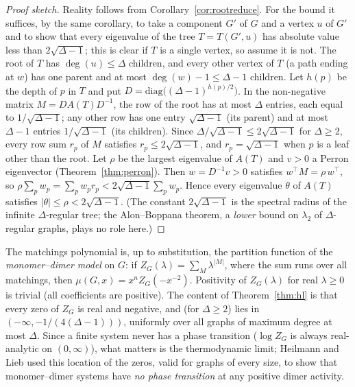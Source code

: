 \begin{proof}[Proof sketch]
Reality follows from Corollary~\ref{cor:rootreduce}. For the bound it
suffices, by the same corollary, to take a component $G'$ of $G$ and a
vertex $u$ of $G'$ and to show that every eigenvalue of the tree
$T = T(G', u)$ has absolute value less than $2\sqrt{\Delta - 1}$; this is
clear if $T$ is a single vertex, so assume it is not. The root of $T$
has $\deg(u) \le \Delta$ children, and every other vertex of $T$ (a path
ending at $w$) has one parent and at most $\deg(w) - 1 \le \Delta - 1$
children. Let $h(p)$ be the depth of $p$ in $T$ and put
$D = \mathrm{diag}\big((\Delta - 1)^{h(p)/2}\big)$. In the non-negative
matrix $M = D A(T) D^{-1}$, the row of the root has at most $\Delta$
entries, each equal to $1/\sqrt{\Delta - 1}$; any other row has one entry
$\sqrt{\Delta - 1}$ (its parent) and at most $\Delta - 1$ entries
$1/\sqrt{\Delta - 1}$ (its children). Since
$\Delta/\sqrt{\Delta - 1} \le 2\sqrt{\Delta - 1}$ for $\Delta \ge 2$, every
row sum $r_p$ of $M$ satisfies $r_p \le 2\sqrt{\Delta - 1}$, and
$r_p = \sqrt{\Delta - 1}$ when $p$ is a leaf other than the root. Let
$\rho$ be the largest eigenvalue of $A(T)$ and $v > 0$ a Perron
eigenvector (Theorem~\ref{thm:perron}). Then $w = D^{-1} v > 0$
satisfies $w^\top M = \rho\, w^\top$, so
$\rho \sum_p w_p = \sum_p w_p r_p < 2\sqrt{\Delta - 1} \sum_p w_p$.
Hence every eigenvalue $\theta$ of $A(T)$ satisfies
$|\theta| \le \rho < 2\sqrt{\Delta - 1}$. (The constant
$2\sqrt{\Delta - 1}$ is the spectral radius of the infinite
$\Delta$-regular tree; the Alon--Boppana theorem, a \emph{lower} bound
on $\lambda_2$ of $\Delta$-regular graphs, plays no role here.)
\end{proof}

\begin{remark}
The matchings polynomial is, up to substitution, the partition function
of the \emph{monomer--dimer model} on $G$: if
$Z_G(\lambda) = \sum_M \lambda^{|M|}$, where the sum runs over all
matchings, then $\mu(G, x) = x^{n} Z_G(-x^{-2})$. Positivity of
$Z_G(\lambda)$ for real $\lambda \ge 0$ is trivial (all coefficients are
positive). The content of Theorem~\ref{thm:hl} is that every zero of
$Z_G$ is real and negative, and (for $\Delta \ge 2$) lies in
$(-\infty, -1/(4(\Delta - 1)))$, uniformly over all graphs of maximum
degree at most $\Delta$. Since a finite system never has a phase
transition ($\log Z_G$ is always real-analytic on $(0, \infty)$), what
matters is the thermodynamic limit; Heilmann and Lieb used this
location of the zeros, valid for graphs of every size, to show that
monomer--dimer systems have \emph{no phase transition} at any positive
dimer activity.
\end{remark}

